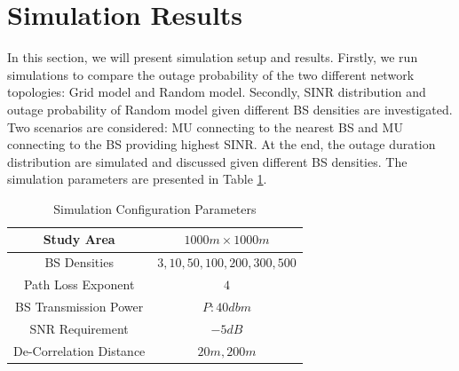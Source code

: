  \section{Simulation Results}
 \label{4:SimuProb}
 \par In this section, we will present simulation setup and results. Firstly, we run simulations to compare the outage probability of the two different network topologies: Grid model and Random model. Secondly, SINR distribution and outage probability of Random model given different BS densities are investigated. Two scenarios are considered: MU connecting to the nearest BS and MU connecting to the BS providing highest SINR. At the end, the outage duration distribution are simulated and discussed given different BS densities. The simulation parameters are presented in Table \ref{SystemConfig2}. 
 \begin{table}
 \centering
 \caption{\label{SystemConfig2}Simulation Configuration Parameters}

 \begin{tabular}{|c|c|}

 \hline
 Study Area & $1000m\times 1000m$\\
 \hline
 BS Densities & $3, 10, 50, 100, 200, 300, 500$\\
 \hline
 Path Loss Exponent & $4$\\
 \hline
 BS Transmission Power & $P: 40dbm$\\
 \hline
 SNR Requirement & $-5dB$\\
 \hline
 De-Correlation Distance & $20m, 200m$\\
 \hline
 \end{tabular}

 \end{table}

